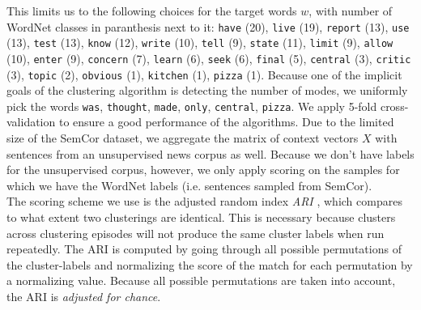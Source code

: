 \documentclass[a4paper,12pt,oneside,openright]{report}
\begin{document}
This limits us to the following choices for the target words $w$, with number of WordNet classes in paranthesis next to it: 
\Verb#have# (20), \Verb#live# (19), \Verb#report# (13), \Verb#use# (13), \Verb#test# (13), \Verb#know# (12), \Verb#write# (10), \Verb#tell# (9), \Verb#state# (11), \Verb#limit# (9), \Verb#allow# (10), \Verb#enter# (9), \Verb#concern# (7), \Verb#learn# (6), \Verb#seek# (6), \Verb#final# (5), \Verb#central# (3), \Verb#critic# (3), \Verb#topic# (2), \Verb#obvious# (1), \Verb#kitchen# (1), \Verb#pizza# (1).
Because one of the implicit goals of the clustering algorithm is detecting the number of modes, we uniformly pick the words \Verb#was#, \Verb#thought#, \Verb#made#, \Verb#only#, \Verb#central#, \Verb#pizza#.
We apply 5-fold cross-validation to ensure a good performance of the algorithms.
Due to the limited size of the SemCor dataset, we aggregate the matrix of context vectors $X$ with sentences from an unsupervised news corpus as well.
Because we don't have labels for the unsupervised corpus, however, we only apply scoring on the samples for which we have the WordNet labels (i.e. sentences sampled from SemCor). \\

The scoring scheme we use is the adjusted random index \textit{ARI} \cite{rand71}, \cite{hubert85} which compares to what extent two clusterings are identical.
This is necessary because clusters across clustering episodes will not produce the same cluster labels when run repeatedly.
The ARI is computed by going through all possible permutations of the cluster-labels and normalizing the score of the match for each permutation by a normalizing value.
Because all possible permutations are taken into account, the ARI is \textit{adjusted for chance}.
\end{document}
